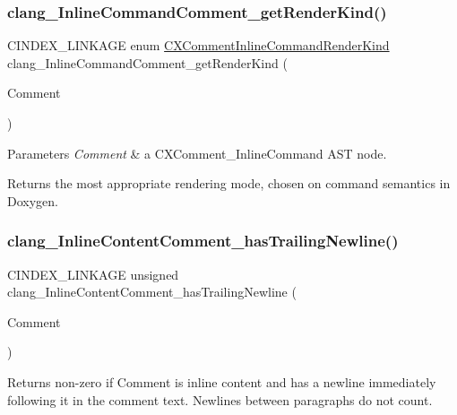 \subsubsection{\texorpdfstring{clang\+\_\+\+Inline\+Command\+Comment\+\_\+get\+Render\+Kind()}{clang\_InlineCommandComment\_getRenderKind()}}
{\footnotesize\ttfamily C\+I\+N\+D\+E\+X\+\_\+\+L\+I\+N\+K\+A\+GE enum \hyperlink{group__CINDEX__COMMENT_ga23efacd9c1e4e286a9f9714e1720fdcf}{C\+X\+Comment\+Inline\+Command\+Render\+Kind} clang\+\_\+\+Inline\+Command\+Comment\+\_\+get\+Render\+Kind (\begin{DoxyParamCaption}\item[{\hyperlink{structCXComment}{C\+X\+Comment}}]{Comment }\end{DoxyParamCaption})}


\begin{DoxyParams}{Parameters}
{\em Comment} & a {\ttfamily C\+X\+Comment\+\_\+\+Inline\+Command} A\+ST node.\\
\hline
\end{DoxyParams}
\begin{DoxyReturn}{Returns}
the most appropriate rendering mode, chosen on command semantics in Doxygen. 
\end{DoxyReturn}
\mbox{\label{group__CINDEX__COMMENT_gacbc2924271ca86226c024e859e0a75c8}} 
\subsubsection{\texorpdfstring{clang\+\_\+\+Inline\+Content\+Comment\+\_\+has\+Trailing\+Newline()}{clang\_InlineContentComment\_hasTrailingNewline()}}
{\footnotesize\ttfamily C\+I\+N\+D\+E\+X\+\_\+\+L\+I\+N\+K\+A\+GE unsigned clang\+\_\+\+Inline\+Content\+Comment\+\_\+has\+Trailing\+Newline (\begin{DoxyParamCaption}\item[{\hyperlink{structCXComment}{C\+X\+Comment}}]{Comment }\end{DoxyParamCaption})}

\begin{DoxyReturn}{Returns}
non-\/zero if {\ttfamily Comment} is inline content and has a newline immediately following it in the comment text. Newlines between paragraphs do not count. 
\end{DoxyReturn}
\mbox{\label{group__CINDEX__COMMENT_gac78b84734e9e6040a001a0036e6aa15c}} 
